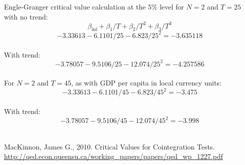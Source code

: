 \documentclass[12pt]{article}
\begin{document}
Engle-Granger critical value calculation at the $5\%$ level for $N=2$ and $T=25$ with no trend:
$$\beta_{\inf} + \beta_{1}/T + \beta_{2}/T^{2}+\beta_3/T^3 $$
$$-3.33613 - 6.1101/25 - 6.823/25^2 = -3.635118$$\\

With trend:
$$-3.78057 - 9.5106/25 - 12.074/25^2 = -4.257586$$\\

For $N=2$ and $T=45$, as with GDP per capita in local currency units:
$$-3.33613 - 6.1101/45 - 6.823/45^2 = -3.475$$\\

With trend:
$$-3.78057 - 9.5106/45 - 12.074/45^2 = -3.998$$\\

\begin{thebibliography}{9}

MacKinnon, James G., 2010. Critical Values for Cointegration Tests. \url{http://qed.econ.queensu.ca/working_papers/papers/qed_wp_1227.pdf}

\end{thebibliography}
\end{document}
